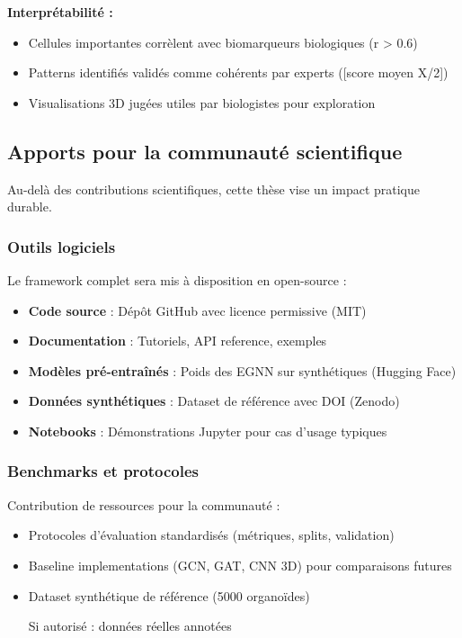 \textbf{Interprétabilité :}
\begin{itemize}
    \item Cellules importantes corrèlent avec biomarqueurs biologiques (r > 0.6)
    \item Patterns identifiés validés comme cohérents par experts ([score moyen X/2])
    \item Visualisations 3D jugées utiles par biologistes pour exploration
\end{itemize}

\subsection{Apports pour la communauté scientifique}

Au-delà des contributions scientifiques, cette thèse vise un impact pratique durable.

\subsubsection{Outils logiciels}

Le framework complet sera mis à disposition en open-source :
\begin{itemize}
    \item \textbf{Code source} : Dépôt GitHub avec licence permissive (MIT)
    \item \textbf{Documentation} : Tutoriels, API reference, exemples
    \item \textbf{Modèles pré-entraînés} : Poids des EGNN sur synthétiques (Hugging Face)
    \item \textbf{Données synthétiques} : Dataset de référence avec DOI (Zenodo)
    \item \textbf{Notebooks} : Démonstrations Jupyter pour cas d'usage typiques
\end{itemize}

\subsubsection{Benchmarks et protocoles}

Contribution de ressources pour la communauté :
\begin{itemize}
    \item Protocoles d'évaluation standardisés (métriques, splits, validation)
    \item Baseline implementations (GCN, GAT, CNN 3D) pour comparaisons futures
    \item Dataset synthétique de référence (5000 organoïdes)
    \item [Si autorisé : données réelles annotées]
\end{itemize}


